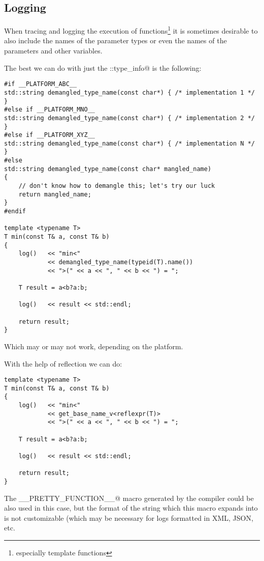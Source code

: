 \subsection{Logging}

When tracing and logging the execution of functions\footnote{especially template
functions} it is sometimes desirable to also include the names of the parameter
types or even the names of the parameters and other variables.

The best we can do with just the \verb@std::type_info@ is the following:

\begin{verbatim}
#if __PLATFORM_ABC__
std::string demangled_type_name(const char*) { /* implementation 1 */ }
#else if __PLATFORM_MNO__
std::string demangled_type_name(const char*) { /* implementation 2 */ }
#else if __PLATFORM_XYZ__
std::string demangled_type_name(const char*) { /* implementation N */ }
#else
std::string demangled_type_name(const char* mangled_name)
{
	// don't know how to demangle this; let's try our luck
	return mangled_name;
}
#endif

template <typename T>
T min(const T& a, const T& b)
{
	log()   << "min<"
	        << demangled_type_name(typeid(T).name())
	        << ">(" << a << ", " << b << ") = ";

	T result = a<b?a:b;

	log()   << result << std::endl;

	return result;
}

\end{verbatim}

Which may or may not work, depending on the platform.

With the help of reflection we can do:

\begin{verbatim}
template <typename T>
T min(const T& a, const T& b)
{
	log()   << "min<"
	        << get_base_name_v<reflexpr(T)>
	        << ">(" << a << ", " << b << ") = ";

	T result = a<b?a:b;

	log()   << result << std::endl;

	return result;
}
\end{verbatim}

The \verb@__PRETTY_FUNCTION__@ macro generated by the compiler could be also
used in this case, but the format of the string which this macro expands into
is not customizable (which may be necessary for logs formatted in XML, JSON, etc.

